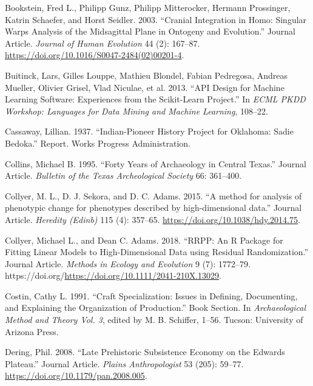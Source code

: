 \documentclass[smallextended]{svjour3}       %
\newlength{\cslhangindent}
\newlength{\cslentryspacingunit} %
\newenvironment{CSLReferences}[2] %
 {%
  \setlength{\parindent}{0pt}
  \ifodd #1
  \let\oldpar\par
  \def\par{\hangindent=\cslhangindent\oldpar}
  \fi
  \setlength{\parskip}{#2\cslentryspacingunit}
 }%
 {}
\begin{document}
\begin{CSLReferences}{1}{0}
\leavevmode{}%
Bookstein, Fred L., Philipp Gunz, Philipp Mitterocker, Hermann
Prossinger, Katrin Schaefer, and Horst Seidler. 2003. {``{Cranial
Integration in Homo: Singular Warps Analysis of the Midsagittal Plane in
Ontogeny and Evolution}.''} Journal Article. \emph{Journal of Human
Evolution} 44 (2): 167--87.
\url{https://doi.org/10.1016/S0047-2484(02)00201-4}.

\leavevmode{}%
Buitinck, Lars, Gilles Louppe, Mathieu Blondel, Fabian Pedregosa,
Andreas Mueller, Olivier Grisel, Vlad Niculae, et al. 2013. {``{API}
Design for Machine Learning Software: Experiences from the Scikit-Learn
Project.''} In \emph{ECML PKDD Workshop: Languages for Data Mining and
Machine Learning}, 108--22.

\leavevmode{}%
Cassaway, Lillian. 1937. {``{Indian-Pioneer History Project for
Oklahoma: Sadie Bedoka}.''} Report. Works Progress Administration.

\leavevmode{}%
Collins, Michael B. 1995. {``{Forty Years of Archaeology in Central
Texas}.''} Journal Article. \emph{Bulletin of the Texas Archeological
Society} 66: 361--400.

\leavevmode{}%
Collyer, M. L., D. J. Sekora, and D. C. Adams. 2015. {``{A method for
analysis of phenotypic change for phenotypes described by
high-dimensional data}.''} Journal Article. \emph{Heredity (Edinb)} 115
(4): 357--65. \url{https://doi.org/10.1038/hdy.2014.75}.

\leavevmode{}%
Collyer, Michael L., and Dean C. Adams. 2018. {``{RRPP: An R Package for
Fitting Linear Models to High-Dimensional Data using Residual
Randomization}.''} Journal Article. \emph{Methods in Ecology and
Evolution} 9 (7): 1772--79.
https://doi.org/\url{https://doi.org/10.1111/2041-210X.13029}.

\leavevmode{}%
Costin, Cathy L. 1991. {``{Craft Specialization: Issues in Defining,
Documenting, and Explaining the Organization of Production}.''} Book
Section. In \emph{Archaeological Method and Theory Vol. 3}, edited by M.
B. Schiffer, 1--56. Tucson: University of Arizona Press.

\leavevmode{}%
Dering, Phil. 2008. {``{Late Prehistoric Subsistence Economy on the
Edwards Plateau}.''} Journal Article. \emph{Plains Anthropologist} 53
(205): 59--77. \url{https://doi.org/10.1179/pan.2008.005}.


\end{CSLReferences}
\end{document}
